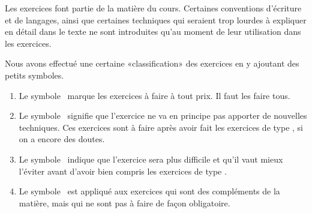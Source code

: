 		Les exercices font partie de la matière du cours. Certaines conventions d'écriture et de langages, ainsi que certaines techniques qui seraient trop lourdes à expliquer en détail dans le texte ne sont introduites qu'au moment de leur utilisation dans les exercices.


Nous avons effectué une certaine «classification» des exercices en y ajoutant des petits symboles.
\begin{enumerate}
	\item Le symbole \minsyndical\ marque les exercices à faire à tout prix. Il faut les faire tous.
	\item Le symbole \boringexo\ signifie que l'exercice ne va en principe pas apporter de nouvelles techniques. Ces exercices sont à faire après avoir fait les exercices de type \minsyndical, si on a encore des doutes.
	\item Le symbole \coolexo\ indique que l'exercice sera plus difficile et qu'il vaut mieux l'éviter avant d'avoir bien compris les exercices de type \minsyndical.
	\item Le symbole \mortelexo\ est appliqué aux exercices qui sont des compléments de la matière, mais qui ne sont pas à faire de façon obligatoire.
\end{enumerate}
